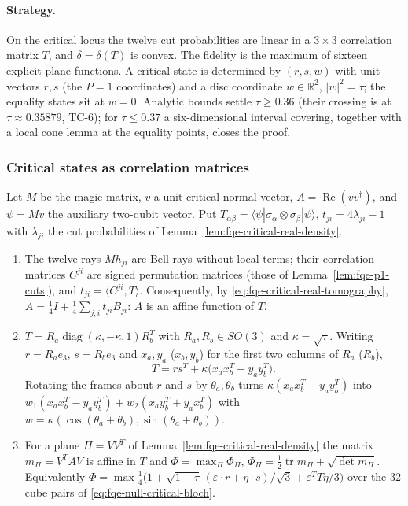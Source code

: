 \paragraph{Strategy.}
On the critical locus the twelve cut probabilities are linear in a $3\times3$ correlation matrix $T$, and
$\delta=\delta(T)$ is convex. The fidelity is the maximum of sixteen explicit plane functions. A critical state is
determined by $(r,s,w)$ with unit vectors $r,s$ (the $P=1$ coordinates) and a disc coordinate $w\in\mathbb R^2$,
$|w|^2=\tau$; the equality states sit at $w=0$. Analytic bounds settle $\tau\ge0.36$ (their crossing is at $\tau\approx0.35879$, TC-6); for $\tau\le0.37$ a
six-dimensional interval covering, together with a local cone lemma at the equality points, closes the proof.

\subsubsection*{Critical states as correlation matrices}
Let $M$ be the magic matrix, $v$ a unit critical normal vector, $A=\operatorname{Re}(vv^\dagger)$, and
$\psi=Mv$ the auxiliary two-qubit vector.  Put $T_{\alpha\beta}=\langle\psi|\sigma_\alpha\otimes\sigma_\beta|\psi\rangle$,
$t_{ji}=4\lambda_{ji}-1$ with $\lambda_{ji}$ the cut probabilities of Lemma~\ref{lem:fqe-critical-real-density}.
\begin{lemma}\label{lem:fqe-critical-correlation}
\begin{enumerate}
\item The twelve rays $Mh_{ji}$ are Bell rays without local terms; their correlation matrices $C^{ji}$ are signed
permutation matrices (those of Lemma~\ref{lem:fqe-p1-cuts}), and $t_{ji}=\langle C^{ji},T\rangle$.
Consequently, by \eqref{eq:fqe-critical-real-tomography},
$A=\tfrac14I+\tfrac14\sum_{j,i}t_{ji}B_{ji}$: $A$ is an affine function of $T$.
\item $T=R_a\operatorname{diag}(\kappa,-\kappa,1)R_b^{T}$ with $R_a,R_b\in SO(3)$ and $\kappa=\sqrt\tau$.  Writing
$r=R_ae_3$, $s=R_be_3$ and $x_a,y_a$ ($x_b,y_b$) for the first two columns of $R_a$ ($R_b$),
\[
 T=rs^T+\kappa\bigl(x_ax_b^T-y_ay_b^T\bigr).
\]
Rotating the frames about $r$ and $s$ by $\theta_a,\theta_b$ turns $\kappa(x_ax_b^T-y_ay_b^T)$ into
$w_1(x_ax_b^T-y_ay_b^T)+w_2(x_ay_b^T+y_ax_b^T)$ with $w=\kappa(\cos(\theta_a+\theta_b),\sin(\theta_a+\theta_b))$.
\item For a plane $\Pi=VV^T$ of Lemma~\ref{lem:fqe-critical-real-density} the matrix $m_\Pi=V^TAV$ is affine in $T$ and
$\Phi=\max_\Pi\Phi_\Pi$, $\Phi_\Pi=\tfrac12\operatorname{tr}m_\Pi+\sqrt{\det m_\Pi}$.  Equivalently
$\Phi=\max\tfrac14\bigl(1+\sqrt{1-\tau}\,(\varepsilon\!\cdot\! r+\eta\!\cdot\! s)/\sqrt3+\varepsilon^TT\eta/3\bigr)$ over the
$32$ cube pairs of \eqref{eq:fqe-null-critical-bloch}.
\end{enumerate}
\end{lemma}

